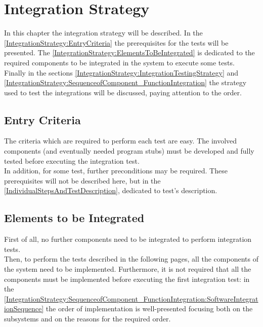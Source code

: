 \documentclass[\mainpath/main]{subfiles}
\begin{document}
\chapter{Integration Strategy} %
\label{IntegrationStrategy}

\setmyfancystyle

In this chapter the integration strategy will be described. In the \autoref{IntegrationStrategy:EntryCriteria} the prerequisites for the tests will be presented. The \autoref{IntegrationStrategy:ElementsToBeIntegrated} is dedicated to the required components to be integrated in the system to execute some tests.\\
Finally in the sections \ref{IntegrationStrategy:IntegrationTestingStrategy} and \ref{IntegrationStrategy:SequenceofComponent_FunctionIntegration} the strategy used to test the integrations will be discussed, paying attention to the order.

\section{Entry Criteria}
\label{IntegrationStrategy:EntryCriteria}
The criteria which are required to perform each test are easy. The involved components (and eventually needed program stubs) must be developed and fully tested before executing the integration test.\\
In addition, for some test, further preconditions may be required. These prerequisites will not be described here, but in the \autoref{IndividualStepsAndTestDescription}, dedicated to test's description.

\section{Elements to be Integrated}
\label{IntegrationStrategy:ElementsToBeIntegrated}
First of all, no further components need to be integrated to perform integration tests.\\
Then, to perform the tests described in the following pages, all the components of the system need to be implemented. Furthermore, it is not required that all the components must be implemented before executing the first integration test: in the \autoref{IntegrationStrategy:SequenceofComponent_FunctionIntegration:SoftwareIntegrationSequence} the order of implementation is well-presented focusing both on the subsystems and on the reasons for the required order.
\end{document}
